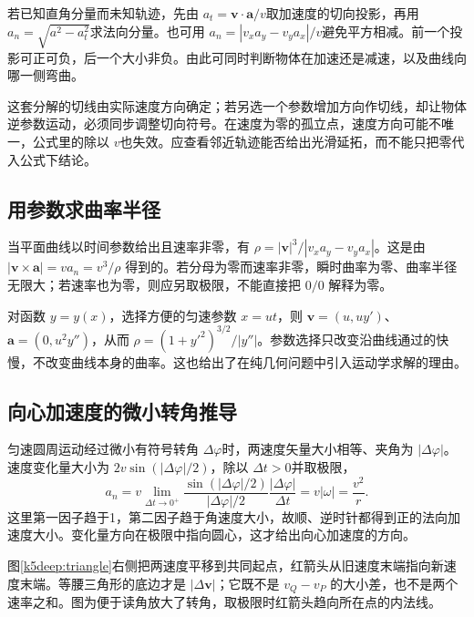 若已知直角分量而未知轨迹，先由 $a_t=\bm v\cdot\bm a/v$取加速度的切向投影，再用 $a_n=\sqrt{a^2-a_t^2}$求法向分量。也可用 $a_n=|v_xa_y-v_ya_x|/v$避免平方相减。前一个投影可正可负，后一个大小非负。由此可同时判断物体在加速还是减速，以及曲线向哪一侧弯曲。

这套分解的切线由实际速度方向确定；若另选一个参数增加方向作切线，却让物体逆参数运动，必须同步调整切向符号。在速度为零的孤立点，速度方向可能不唯一，公式里的除以 $v$也失效。应查看邻近轨迹能否给出光滑延拓，而不能只把零代入公式下结论。

\subsection{用参数求曲率半径}
当平面曲线以时间参数给出且速率非零，有 $\rho=|\bm v|^3/|v_xa_y-v_ya_x|$。这是由 $|\bm v\times\bm a|=v a_n=v^3/\rho$ 得到的。若分母为零而速率非零，瞬时曲率为零、曲率半径无限大；若速率也为零，则应另取极限，不能直接把 $0/0$ 解释为零。

对函数 $y=y(x)$，选择方便的匀速参数 $x=ut$，则 $\bm v=(u,uy')$、$\bm a=(0,u^2y'')$，从而 $\rho=(1+y'^2)^{3/2}/|y''|$。参数选择只改变沿曲线通过的快慢，不改变曲线本身的曲率。这也给出了在纯几何问题中引入运动学求解的理由。

\subsection{向心加速度的微小转角推导}
匀速圆周运动经过微小有符号转角 $\Delta\varphi$时，两速度矢量大小相等、夹角为 $|\Delta\varphi|$。速度变化量大小为 $2v\sin(|\Delta\varphi|/2)$，除以 $\Delta t>0$并取极限，
\[a_n=v\lim_{\Delta t\to0^+}
 \frac{\sin(|\Delta\varphi|/2)}{|\Delta\varphi|/2}
 \frac{|\Delta\varphi|}{\Delta t}
 =v|\omega|=\frac{v^2}{r}.\]
这里第一因子趋于1，第二因子趋于角速度大小，故顺、逆时针都得到正的法向加速度大小。变化量方向在极限中指向圆心，这才给出向心加速度的方向。

图\ref{k5deep:triangle}右侧把两速度平移到共同起点，红箭头从旧速度末端指向新速度末端。等腰三角形的底边才是 $|\Delta\bm v|$；它既不是 $v_Q-v_P$ 的大小差，也不是两个速率之和。图为便于读角放大了转角，取极限时红箭头趋向所在点的内法线。

